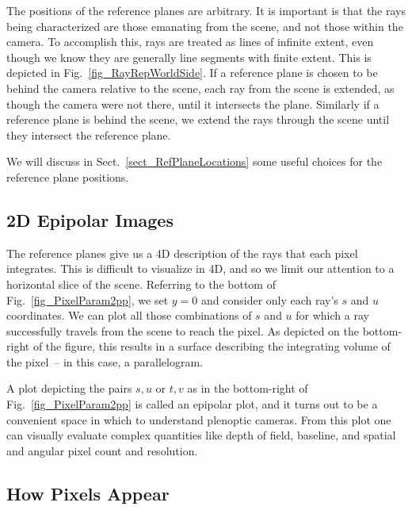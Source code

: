 \documentclass[onecolumn]{article}
\begin{document}
The positions of the reference planes are arbitrary.  It is important is that the rays being characterized are those emanating from the scene, and not those within the camera.  To accomplish this, rays are treated as lines of infinite extent, even though we know they are generally line segments with finite extent. This is depicted in Fig.~\ref{fig_RayRepWorldSide}. If a reference plane is chosen to be behind the camera relative to the scene, each ray from the scene is extended, as though the camera were not there, until it intersects the plane. Similarly if a reference plane is behind the scene, we extend the rays through the scene until they intersect the reference plane.

We will discuss in Sect.~\ref{sect_RefPlaneLocations} some useful choices for the reference plane positions.

\subsection{2D Epipolar Images}

The reference planes give us a 4D description of the rays that each pixel integrates.  This is difficult to visualize in 4D, and so we limit our attention to a horizontal slice of the scene. Referring to the bottom of Fig.~\ref{fig_PixelParam2pp}, we set $y=0$ and consider only each ray's $s$ and $u$ coordinates.  We can plot all those combinations of $s$ and $u$ for which a ray successfully travels from the scene to reach the pixel.  As depicted on the bottom-right of the figure, this results in a surface describing the integrating volume of the pixel~-- in this case, a parallelogram.

A plot depicting the pairs $s,u$ or $t,v$ as in the bottom-right of Fig.~\ref{fig_PixelParam2pp} is called an epipolar plot, and it turns out to be a convenient space in which to understand plenoptic cameras.  From this plot one can visually evaluate complex quantities like depth of field, baseline, and spatial and angular pixel count and resolution.

\subsection{How Pixels Appear}
\end{document}
